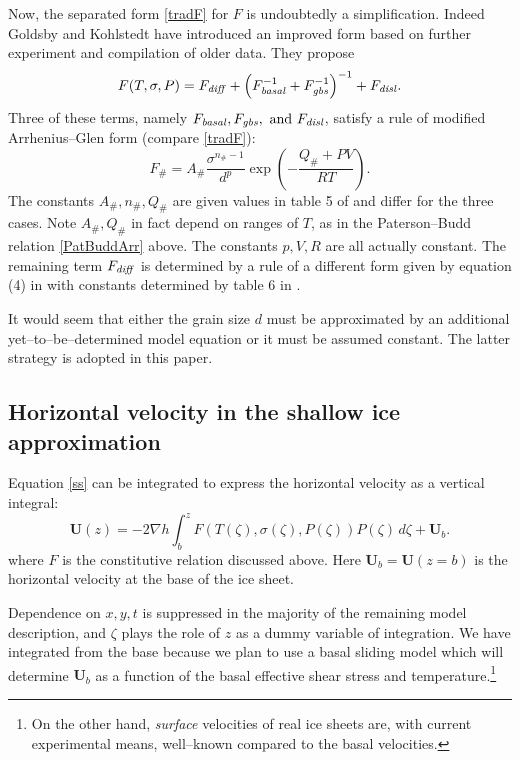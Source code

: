 \documentclass[12pt,final]{amsart}%
\theoremstyle{plain}
\theoremstyle{definition}
\theoremstyle{remark}
\newcommand{\grad}{\nabla}
\newcommand{\bU}{{\mathbf{U}}}
\begin{document}
Now, the separated form \eqref{tradF} for $F$ is undoubtedly a simplification.  Indeed Goldsby and Kohlstedt \citep{GoldsbyKohlstedt} have introduced an improved form based on further experiment and compilation of older data.  They propose
\begin{equation}\label{GKF}
F(T,\sigma,P)=F_{\text{\emph{diff}}} + \left(F_{\text{\emph{basal}}}^{-1} + F_{\text{\emph{gbs}}}^{-1}\right)^{-1} +F_{\text{\emph{disl}}}.
\end{equation}
Three of these terms, namely  $F_{\text{\emph{basal}}}, F_{\text{\emph{gbs}}}, \text{ and } F_{\text{\emph{disl}}}$, satisfy a rule of modified Arrhenius--Glen form (compare \eqref{tradF}):
    $$F_{\#}=A_{\#} \frac{\sigma^{n_{\#}-1}}{d^p} \exp\left(-\frac{Q_{\#}+PV}{RT}\right).$$
The constants $A_{\#},n_{\#},Q_{\#}$ are given values in table 5 of \citep{GoldsbyKohlstedt} and differ for the three cases.  Note $A_{\#},Q_{\#}$ in fact depend on ranges of $T$, as in the Paterson--Budd relation \eqref{PatBuddArr} above.  The constants $p, V, R$ are all actually constant.  The remaining term $F_{\text{\emph{diff}}}$ is determined by a rule of a different form given by equation (4) in \citep{GoldsbyKohlstedt} with constants determined by table 6 in \citep{GoldsbyKohlstedt}.

It would seem that either the grain size $d$ must be approximated by an additional yet--to--be--determined model equation or it must be assumed constant.  The latter strategy is adopted in this paper.


\subsection*{Horizontal velocity in the shallow ice approximation}\label{ss:horvel}  Equation \eqref{ss} can be integrated to express the horizontal velocity as a vertical integral:
    $$\bU(z) = - 2 \grad h \int_{b}^z F(T(\zeta),\sigma(\zeta),P(\zeta)) P(\zeta)\,d\zeta + \bU_b.$$
where $F$ is the constitutive relation discussed above.  Here $\bU_b=\bU(z=b)$ is the horizontal velocity at the base of the ice sheet.

Dependence on $x,y,t$ is suppressed in the majority of the remaining model description, and $\zeta$ plays the role of $z$ as a dummy variable of integration.  We have integrated from the base because we plan to use a basal sliding model which will determine $\bU_b$ as a function of the basal effective shear stress and temperature.\footnote{On the other hand, \emph{surface} velocities of real ice sheets are, with current experimental means, well--known compared to the basal velocities.}
\end{document}
